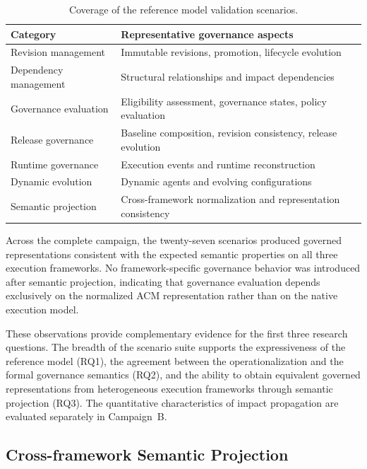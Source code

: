 \documentclass[10pt]{article}
\begin{document}
\begin{table}[t]
	\centering
	\caption{Coverage of the reference model validation scenarios.}
	\label{tab:scenario_categories}
	\small
	\begin{tabular}{p{3.2cm}p{3.8cm}}
		\toprule
		\textbf{Category} & \textbf{Representative governance aspects} \\
		\midrule
		Revision management &
		Immutable revisions, promotion, lifecycle evolution \\
		Dependency management &
		Structural relationships and impact dependencies \\
		Governance evaluation &
		Eligibility assessment, governance states, policy evaluation \\
		Release governance &
		Baseline composition, revision consistency, release evolution \\
		Runtime governance &
		Execution events and runtime reconstruction \\
		Dynamic evolution &
		Dynamic agents and evolving configurations \\
		Semantic projection &
		Cross-framework normalization and representation consistency \\
		\bottomrule
	\end{tabular}
\end{table}

Across the complete campaign, the twenty-seven scenarios produced governed representations consistent with the expected semantic properties on all three execution frameworks. No framework-specific governance behavior was introduced after semantic projection, indicating that governance evaluation depends exclusively on the normalized ACM representation rather than on the native execution model.

These observations provide complementary evidence for the first three research questions. The breadth of the scenario suite supports the expressiveness of the reference model (RQ1), the agreement between the operationalization and the formal governance semantics (RQ2), and the ability to obtain equivalent governed representations from heterogeneous execution frameworks through semantic projection (RQ3). The quantitative characteristics of impact propagation are evaluated separately in Campaign~B.

\subsection{Cross-framework Semantic Projection}
\label{sec:cross_framework_projection}
\end{document}
